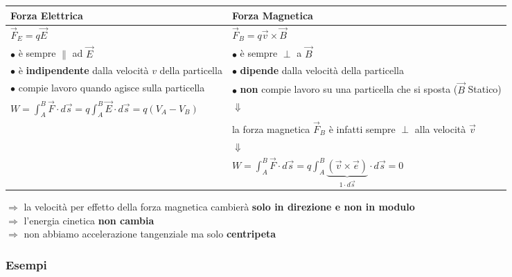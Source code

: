 \documentclass[../main.tex]{subfiles}
\begin{document}
	\begin{center}
		\begin{tabular}{|l|l|}
			\hline
			\textbf{Forza Elettrica} & \textbf{Forza Magnetica} \\ 
			\hline
			$\vec{F}_E = q \vec{E}$ & $\vec{F}_B = q \vec{v} \times \vec{B}$\\
			\hline
			$\bullet$ è sempre $\parallel$ ad $\vec{E}$ & $\bullet$  è sempre $\perp$ a $\vec{B}$ \\
			$\bullet$ è \textbf{indipendente} dalla velocità $v$ della particella & $\bullet$ \textbf{dipende} dalla velocità della particella \\
			$\bullet$ compie lavoro quando agisce sulla particella & $\bullet$ \textbf{non} compie lavoro su una particella che si sposta ($\vec{B}$ Statico) \\
			$W = \int_A^B \vec{F} \cdot d\vec{s} = q \int_A^B \vec{E} \cdot d\vec{s} = q (V_A - V_B)$ & $\Downarrow$ \\
			\quad & la forza magnetica $\vec{F}_B$ è infatti sempre $\perp$ alla velocità $\vec{v}$ \\
			\quad & $\Downarrow$ \\
			\quad & $W = \int_A^B \vec{F} \cdot d\vec{s} = q \int_A^B \underbrace{(\vec{v} \times \vec{e})}_{1 \cdot d\vec{s}} \cdot d\vec{s} = 0$ \\
			\hline
		\end{tabular}
	\end{center}
	$\Rightarrow$ la velocità per effetto della forza magnetica cambierà \textbf{solo in direzione e non in modulo}\\
	$\Rightarrow$ l’energia cinetica \textbf{non cambia}\\
	$\Rightarrow$ non abbiamo accelerazione tangenziale ma solo \textbf{centripeta}
	\subsubsection{Esempi}
\end{document}
